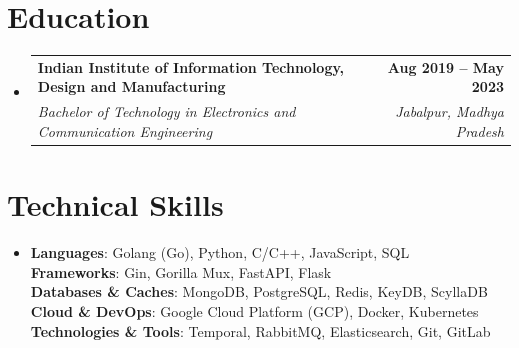 \documentclass[letterpaper,11pt]{article}
\makeatletter
\newcommand{\resumeSubheading}[4]{
  \vspace{-2pt}\item
    \begin{tabular*}{1.0\textwidth}[t]{l@{\extracolsep{\fill}}r}
      \textbf{#1} & \textbf{\small #2} \\
      \textit{\small#3} & \textit{\small #4} \\
    \end{tabular*}\vspace{-7pt}
}
\newcommand{\resumeSubHeadingListStart}{\begin{itemize}[leftmargin=0.0in, label={}]}
\newcommand{\resumeSubHeadingListEnd}{\end{itemize}}
\makeatother
\begin{document}
\section{Education}
  \resumeSubHeadingListStart
    \resumeSubheading
      {Indian Institute of Information Technology, Design and Manufacturing}{ Aug 2019 -- May 2023}
      {Bachelor of Technology in Electronics and Communication Engineering}{Jabalpur, Madhya Pradesh}
  \resumeSubHeadingListEnd



\section{Technical Skills}
 \begin{itemize}[leftmargin=0.15in, label={}]
    \item{
    \textbf{Languages}{: Golang (Go), Python, C/C++, JavaScript, SQL} \\
    \textbf{Frameworks}{: Gin, Gorilla Mux, FastAPI, Flask} \\
    \textbf{Databases \& Caches}{: MongoDB, PostgreSQL, Redis, KeyDB, ScyllaDB} \\
     \textbf{Cloud \& DevOps}{: Google Cloud Platform (GCP), Docker, Kubernetes} \\
     \textbf{Technologies \& Tools}{: Temporal, RabbitMQ, Elasticsearch, Git, GitLab} \\
    }
 \end{itemize}
 \vspace{-20pt}
\end{document}
